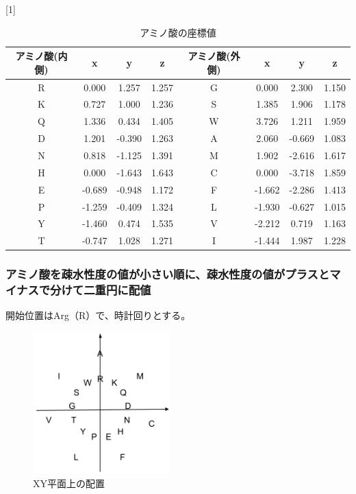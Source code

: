 \documentclass[a4paper,12pt]{jsreport}
\begin{document}
\begin{table}[H]
\centering
\caption{アミノ酸の座標値}
\scalebox{1}[1]{
\begin{tabular}{|cccc|cccc|} \hline
アミノ酸(内側) & x & y & z & アミノ酸(外側) & x & y & z \\ \hline
R & 0.000 & 1.257 & 1.257 & G & 0.000 & 2.300 & 1.150\\[-2mm]
K & 0.727 & 1.000 & 1.236 & S & 1.385 & 1.906 & 1.178 \\[-2mm]
Q & 1.336 & 0.434 & 1.405 & W & 3.726 & 1.211 & 1.959 \\[-2mm]
D & 1.201 & -0.390 & 1.263 & A & 2.060 & -0.669 & 1.083 \\[-2mm]
N & 0.818 & -1.125 & 1.391 & M & 1.902 & -2.616 & 1.617 \\[-2mm]
H & 0.000 & -1.643 & 1.643 & C & 0.000 & -3.718 & 1.859 \\[-2mm]
E & -0.689 & -0.948 & 1.172 & F & -1.662 & -2.286 & 1.413 \\[-2mm]
P & -1.259 & -0.409 & 1.324 & L & -1.930 & -0.627 & 1.015 \\[-2mm]
Y & -1.460 & 0.474 & 1.535 & V & -2.212 & 0.719 & 1.163 \\[-2mm]
T & -0.747 & 1.028 & 1.271 & I & -1.444 & 1.987 & 1.228 \\ \hline
\end{tabular}
}
\end{table}




\subsubsection{アミノ酸を疎水性度の値が小さい順に、疎水性度の値がプラスとマイナスで分けて二重円に配値}
開始位置はArg（R）で、時計回りとする。

\begin{figure}[H]
\centering
\includegraphics[width=53mm]{pic02.png}
\caption{XY平面上の配置}
\end{figure}
\end{document}
